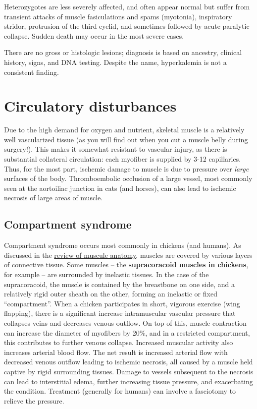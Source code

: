 \documentclass[openany]{book}
\begin{document}
Heterozygotes are less severely affected, and often appear normal but
suffer from transient attacks of muscle fasiculations and spams
(myotonia), inspiratory stridor, protrusion of the third eyelid, and
sometimes followed by acute paralytic collapse. Sudden death may occur
in the most severe cases.

There are no gross or histologic lesions; diagnosis is based on
ancestry, clinical history, signs, and DNA testing. Despite the name,
hyperkalemia is not a consistent finding.

\chapter{Circulatory disturbances}\label{circulatory-disturbances}

Due to the high demand for oxygen and nutrient, skeletal muscle is a
relatively well vascularized tissue (as you will find out when you cut a
muscle belly during surgery!). This makes it somewhat resistant to
vascular injury, as there is substantial collateral circulation: each
myofiber is supplied by 3-12 capillaries. Thus, for the most part,
ischemic damage to muscle is due to pressure over \emph{large} surfaces
of the body. Thromboembolic occlusion of a large vessel, most commonly
seen at the aortoiliac junction in cats (and horses), can also lead to
ischemic necrosis of large areas of muscle.

\section{Compartment syndrome}\label{compartment-syndrome}

Compartment syndrome occurs most commonly in chickens (and humans). As
discussed in the \protect\hyperlink{the-anatomy-of-muscle}{review of
muscule anatomy}, muscles are covered by various layers of connective
tissue. Some muscles -- the \textbf{supracoracoid muscles in chickens},
for example -- are surrounded by inelastic tissues. In the case of the
supracoracoid, the muscle is contained by the breastbone on one side,
and a relatively rigid outer sheath on the other, forming an inelastic
or fixed ``compartment''. When a chicken participates in short, vigorous
exercise (wing flapping), there is a significant increase intramuscular
vascular pressure that collapses veins and decreases venous outflow. On
top of this, muscle contraction can increase the diameter of myofibers
by 20\%, and in a restricted compartment, this contributes to further
venous collapse. Increased muscular activity also increases arterial
blood flow. The net result is increased arterial flow with decreased
venous outflow leading to ischemic necrosis, all caused by a muscle held
captive by rigid surrounding tissues. Damage to vessels subsequent to
the necrosis can lead to interstitial edema, further increasing tissue
pressure, and exacerbating the condition. Treatment (generally for
humans) can involve a fasciotomy to relieve the pressure.
\end{document}

